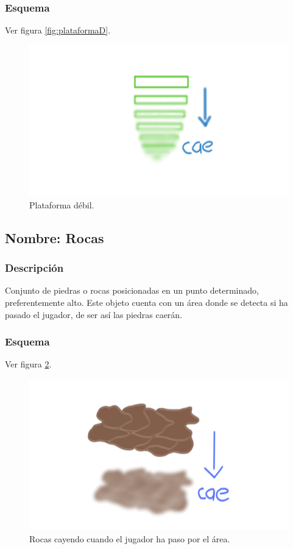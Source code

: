 \documentclass[11pt,letterpaper]{article}
\begin{document}
	\subsubsection{Esquema}
	Ver figura \ref{fig:plataformaD}.
	\begin{figure}
		\centering
		\includegraphics[height=0.2 \textheight]{Imagenes/plataformaD}
		\caption{Plataforma débil.}
		\label{fig:plafarmaD}
	\end{figure}
		\subsection{Nombre: Rocas}\label{obs.rocas}
	\subsubsection{Descripción}
	Conjunto de piedras o rocas posicionadas en un punto determinado, preferentemente alto. Este objeto cuenta con un área donde se detecta si ha pasado el jugador, de ser así las piedras caerán.
	\subsubsection{Esquema}
	Ver figura \ref{fig:rocas}.
	\begin{figure}
		\centering
		\includegraphics[height=0.2 \textheight]{Imagenes/rocas}
		\caption{Rocas cayendo cuando el jugador ha paso por el área.}
		\label{fig:rocas}
	\end{figure}
\end{document}
